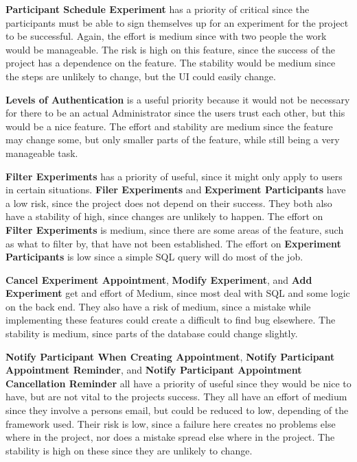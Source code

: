 \textbf{Participant Schedule Experiment} has a priority of critical since the participants must be able to sign themselves up for an experiment for the project to be successful.  Again, the effort is medium since with two people the work would be manageable.  The risk is high on this feature, since the success of the project has a dependence on the feature.  The stability would be medium since the steps are unlikely to change, but the UI could easily change.

\textbf{Levels of Authentication} is a useful priority because it would not be necessary for there to be an actual Administrator since the users trust each other, but this would be a nice feature.  The effort and stability are medium since the feature may change some, but only smaller parts of the feature, while still being a very manageable task.

\textbf{Filter Experiments} has a priority of useful, since it might only apply to users in certain situations.  \textbf{Filer Experiments} and \textbf{Experiment Participants} have a low risk, since the project does not depend on their success.  They both also have a stability of high, since changes are unlikely to happen.  The effort on \textbf{Filter Experiments} is medium, since there are some areas of the feature, such as what to filter by, that have not been established.  The  effort on \textbf{Experiment Participants} is low since a simple \gls{SQL} query will do most of the job.

\textbf{Cancel Experiment Appointment}, \textbf{Modify Experiment}, and \textbf{Add Experiment} get and effort of Medium, since most deal with \gls{SQL} and some logic on the back end.  They also have a risk of medium, since a mistake while implementing these features could create a difficult to find bug elsewhere.  The stability is medium, since parts of the database could change slightly.

\textbf{Notify Participant When Creating Appointment}, \textbf{Notify Participant Appointment Reminder}, and \textbf{Notify Participant Appointment Cancellation Reminder} all have a priority of useful since they would be nice to have, but are not vital to the projects success.  They all have an effort of medium since they involve a persons email, but could be reduced to low, depending of the framework used.  Their risk is low, since a failure here creates no problems else where in the project, nor does a mistake spread else where in the project.  The stability is high on these since they are unlikely to change.

